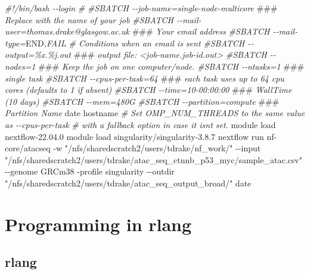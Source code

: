 \documentclass[
]{book}
\newenvironment{Shaded}{\begin{snugshade}}{\end{snugshade}}
\newcommand{\AlertTok}[1]{\textcolor[rgb]{0.94,0.16,0.16}{#1}}
\newcommand{\AttributeTok}[1]{\textcolor[rgb]{0.77,0.63,0.00}{#1}}
\newcommand{\CommentTok}[1]{\textcolor[rgb]{0.56,0.35,0.01}{\textit{#1}}}
\newcommand{\ExtensionTok}[1]{#1}
\newcommand{\FunctionTok}[1]{\textcolor[rgb]{0.00,0.00,0.00}{#1}}
\newcommand{\NormalTok}[1]{#1}
\newcommand{\RegionMarkerTok}[1]{#1}
\newcommand{\StringTok}[1]{\textcolor[rgb]{0.31,0.60,0.02}{#1}}
\begin{document}
\begin{Shaded}
\begin{Highlighting}[]
\CommentTok{\#!/bin/bash {-}{-}login}
\CommentTok{\#}
\CommentTok{\#SBATCH {-}{-}job{-}name=single{-}node{-}multicore }\AlertTok{\#\#\#}\CommentTok{ Replace with the name of your job}
\CommentTok{\#SBATCH {-}{-}mail{-}user=thomas.drake@glasgow.ac.uk }\AlertTok{\#\#\#}\CommentTok{ Your email address}
\CommentTok{\#SBATCH {-}{-}mail{-}type=}\RegionMarkerTok{END}\CommentTok{,FAIL \# Conditions when an email is sent}
\CommentTok{\#SBATCH {-}{-}output=\%x.\%j.out }\AlertTok{\#\#\#}\CommentTok{ output file: \textless{}job{-}name.job{-}id.out\textgreater{}}
\CommentTok{\#SBATCH {-}{-}nodes=1 }\AlertTok{\#\#\#}\CommentTok{ Keep the job on one computer/node.}
\CommentTok{\#SBATCH {-}{-}ntasks=1 }\AlertTok{\#\#\#}\CommentTok{ single task}
\CommentTok{\#SBATCH {-}{-}cpus{-}per{-}task=64  }\AlertTok{\#\#\#}\CommentTok{ each task uses up to 64 cpu cores (defaults to 1 if absent)}
\CommentTok{\#SBATCH {-}{-}time=10{-}00:00:00 }\AlertTok{\#\#\#}\CommentTok{ WallTime (10 days)}
\CommentTok{\#SBATCH {-}{-}mem=480G}
\CommentTok{\#SBATCH {-}{-}partition=compute }\AlertTok{\#\#\#}\CommentTok{ Partition Name}
\FunctionTok{date}
\FunctionTok{hostname}
\CommentTok{\# Set OMP\_NUM\_THREADS to the same value as {-}{-}cpus{-}per{-}task}
\CommentTok{\# with a fallback option in case it isn\textquotesingle{}t set.}
\ExtensionTok{module}\NormalTok{ load nextflow{-}22.04.0}
\ExtensionTok{module}\NormalTok{ load singularity/singularity{-}3.8.7}
\ExtensionTok{nextflow}\NormalTok{ run nf{-}core/atacseq }\AttributeTok{{-}w} \StringTok{"/nfs/sharedscratch2/users/tdrake/nf\_work/"} \AttributeTok{{-}{-}input} \StringTok{"/nfs/sharedscratch2/users/tdrake/atac\_seq\_ctnnb\_p53\_myc/sample\_atac.csv"} \AttributeTok{{-}{-}genome}\NormalTok{ GRCm38 }\AttributeTok{{-}profile}\NormalTok{ singularity }\AttributeTok{{-}{-}outdir} \StringTok{"/nfs/sharedscratch2/users/tdrake/atac\_seq\_output\_broad/"}
\FunctionTok{date}
\end{Highlighting}
\end{Shaded}

\hypertarget{programming-in-rlang}{%
\chapter{Programming in rlang}\label{programming-in-rlang}}

\hypertarget{rlang}{%
\section{rlang}\label{rlang}}
\end{document}
